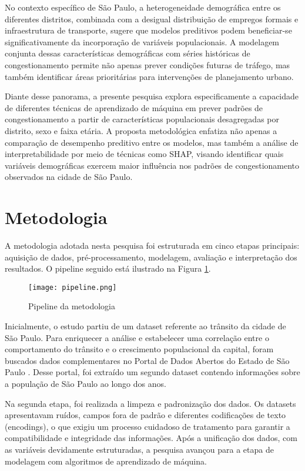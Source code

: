 \documentclass[conference]{IEEEtran}
\begin{document}
No contexto específico de São Paulo, a heterogeneidade demográfica entre os diferentes distritos, combinada com a desigual distribuição de empregos formais e infraestrutura de transporte, sugere que modelos preditivos podem beneficiar-se significativamente da incorporação de variáveis populacionais. A modelagem conjunta dessas características demográficas com séries históricas de congestionamento permite não apenas prever condições futuras de tráfego, mas também identificar áreas prioritárias para intervenções de planejamento urbano.

Diante desse panorama, a presente pesquisa explora especificamente a capacidade de diferentes técnicas de aprendizado de máquina em prever padrões de congestionamento a partir de características populacionais desagregadas por distrito, sexo e faixa etária. A proposta metodológica enfatiza não apenas a comparação de desempenho preditivo entre os modelos, mas também a análise de interpretabilidade por meio de técnicas como SHAP, visando identificar quais variáveis demográficas exercem maior influência nos padrões de congestionamento observados na cidade de São Paulo.

\section{Metodologia}
A metodologia adotada nesta pesquisa foi estruturada em cinco etapas principais: aquisição de dados, pré-processamento, modelagem, avaliação e interpretação dos resultados. O pipeline seguido está ilustrado na Figura \ref{fig:pipeline}.

\begin{figure}[htbp]
\centering
\texttt{[image: pipeline.png]}
\caption{Pipeline da metodologia}
\label{fig:pipeline}
\end{figure}

Inicialmente, o estudo partiu de um dataset referente ao trânsito da cidade de São Paulo. Para enriquecer a análise e estabelecer uma correlação entre o comportamento do trânsito e o crescimento populacional da capital, foram buscados dados complementares no Portal de Dados Abertos do Estado de São Paulo \cite{8}. Desse portal, foi extraído um segundo dataset contendo informações sobre a população de São Paulo ao longo dos anos.

Na segunda etapa, foi realizada a limpeza e padronização dos dados. Os datasets apresentavam ruídos, campos fora de padrão e diferentes codificações de texto (encodings), o que exigiu um processo cuidadoso de tratamento para garantir a compatibilidade e integridade das informações. Após a unificação dos dados, com as variáveis devidamente estruturadas, a pesquisa avançou para a etapa de modelagem com algoritmos de aprendizado de máquina.
\end{document}
